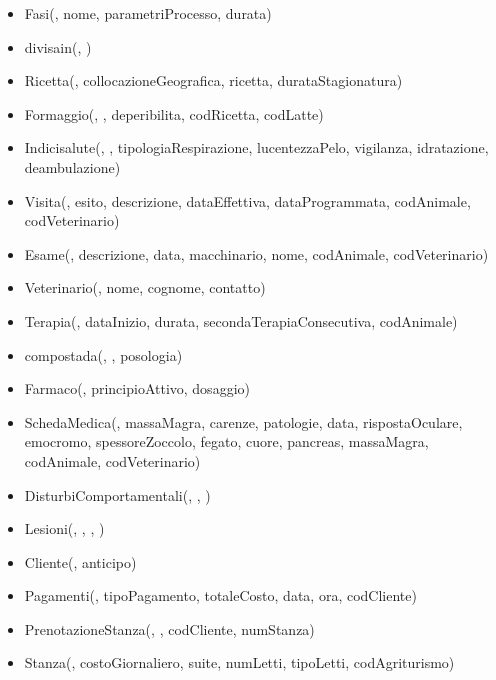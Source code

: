 \documentclass[12pt,a4paper]{article}
\begin{document}
\begin{itemize}
\item Fasi(\underline{}, nome, parametriProcesso, durata)
\item divisain(\underline{}, \underline{})
\item Ricetta(\underline{}, collocazioneGeografica, ricetta, durataStagionatura)
\item Formaggio(\underline{}, \underline{}, deperibilita,  codRicetta,  codLatte)
\item Indicisalute(\underline{}, \underline{}, tipologiaRespirazione, lucentezzaPelo, vigilanza, idratazione, deambulazione)
\item Visita(\underline{}, esito, descrizione, dataEffettiva, dataProgrammata,  codAnimale,  codVeterinario)
\item Esame(\underline{},  descrizione, data, macchinario, nome,  codAnimale,  codVeterinario)
\item Veterinario(\underline{}, nome, cognome, contatto)
\item Terapia(\underline{}, dataInizio, durata, secondaTerapiaConsecutiva,  codAnimale)
\item compostada(\underline{}, \underline{}, posologia)
\item Farmaco(\underline{}, principioAttivo, dosaggio)
\item SchedaMedica(\underline{}, massaMagra, carenze, patologie, data, rispostaOculare, emocromo, spessoreZoccolo, fegato, cuore, pancreas, massaMagra,  codAnimale,  codVeterinario)
\item DisturbiComportamentali(\underline{}, \underline{}, \underline{})
\item Lesioni(\underline{}, \underline{}, \underline{}, \underline{})
\item Cliente(\underline{}, anticipo)
\item Pagamenti(\underline{}, tipoPagamento, totaleCosto, data, ora,  codCliente)
\item PrenotazioneStanza(\underline{}, \underline{},  codCliente,  numStanza)
\item Stanza(\underline{}, costoGiornaliero, suite, numLetti, tipoLetti,  codAgriturismo)

\end{itemize}
\end{document}
